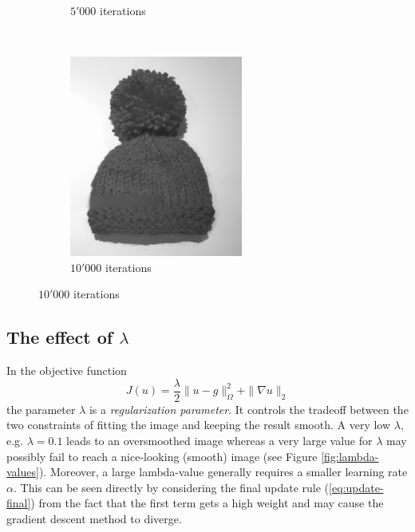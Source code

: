 \documentclass{paper}
\begin{document}
\begin{figure}[ht]
\begin{subfigure}[h]{0.3\textwidth}
	\caption*{$5'000$ iterations}
\end{subfigure}
~
\begin{subfigure}[h]{0.3\textwidth}
	\centering
	\includegraphics[width=\textwidth]{hat-iter10000-lambda100-alpha0_001}
	\caption*{$10'000$ iterations}
\end{subfigure}
\label{fig:results-hat}
\end{figure}

\subsection*{The effect of $\lambda$}
In the objective function
$$J(u) = \frac{\lambda}{2} \|u-g\|_\Omega^2 + \|\nabla u \|_2$$
the parameter $\lambda$ is a \emph{regularization parameter}. It controls the tradeoff between the two constraints of fitting the image and keeping the result smooth. A very low $\lambda$, e.g. $\lambda = 0.1$ leads to an oversmoothed image whereas a very large value for $\lambda$ may possibly fail to reach a nice-looking (smooth) image (see Figure \ref{fig:lambda-values}). Moreover, a large lambda-value generally requires a smaller learning rate $\alpha$. This can be seen directly by considering the final update rule (\ref{eq:update-final}) from the fact that the first term gets a high weight and may cause the gradient descent method to diverge.
\end{document}
